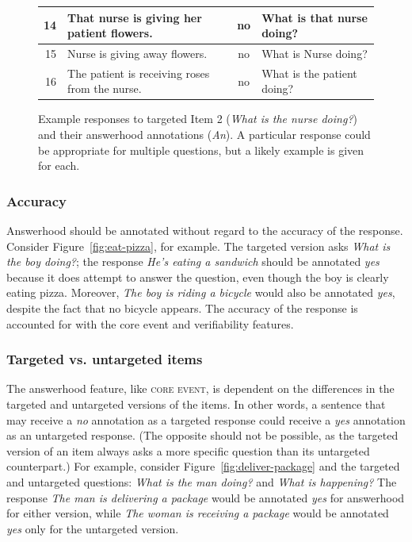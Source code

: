 \documentclass[12pt]{article}
\newcommand{\feat}[1]{\textsc{#1}}
\begin{document}
\begin{figure}[h!]
\begin{center}
\begin{tabular}{|r|l|c|l|}
\hline
14 & That nurse is giving her patient flowers. & no & What is that nurse doing? \\
\hline
15 & Nurse is giving away flowers. & no & What is Nurse doing? \\
\hline
16 & The patient is receiving roses from the nurse. & no & What is the patient doing?\\
\hline
\end{tabular}
\end{center}
\caption{Example responses to targeted Item 2 (\textit{What is the nurse doing?}) and their answerhood annotations (\textit{An}). A particular response could be appropriate for multiple questions, but a likely example is given for each.}
\label{fig:answerhood-examples}
\end{figure}
\clearpage


\subsubsection{Accuracy} Answerhood should be annotated without regard to the accuracy of the response. Consider Figure~\ref{fig:eat-pizza}, for example. The targeted version asks \textit{What is the boy doing?}; the response \textit{He's eating a sandwich} should be annotated \textit{yes} because it does attempt to answer the question, even though the boy is clearly eating pizza. Moreover, \textit{The boy is riding a bicycle} would also be annotated \textit{yes}, despite the fact that no bicycle appears. The accuracy of the response is accounted for with the core event and verifiability features.

\subsubsection{Targeted vs. untargeted items} The answerhood feature, like \feat{core event}, is dependent on the differences in the targeted and untargeted versions of the items. In other words, a sentence that may receive a \textit{no} annotation as a targeted response could receive a \textit{yes} annotation as an untargeted response. (The opposite should not be possible, as the targeted version of an item always asks a more specific question than its untargeted counterpart.) For example, consider Figure~\ref{fig:deliver-package} and the targeted and untargeted questions: \textit{What is the man doing?} and \textit{What is happening?} The response \textit{The man is delivering a package} would be annotated \textit{yes} for answerhood for either version, while \textit{The woman is receiving a package} would be annotated \textit{yes} only for the untargeted version.
\end{document}
